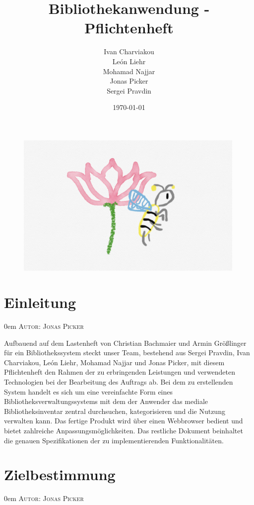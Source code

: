 \documentclass{article}
\title{Bibliothekanwendung - Pflichtenheft}
\date{\today}
\author{
	Ivan Charviakou\\
	León Liehr\\
	Mohamad Najjar\\
	Jonas Picker\\
	Sergei Pravdin
}
\makeatletter
\newcommand{\sectionauthor}[1]{
	{\parindent 0em \large \scshape Autor: #1 \par \nobreak \vspace*{2em}}
	\@afterheading
}
\makeatother
\begin{document}
\maketitle
\begin{figure}[h]
	\centering
	\includegraphics[width = 30em]{Logo}
\end{figure}
\newpage

\tableofcontents
\newpage

\section{Einleitung} %
\sectionauthor{Jonas Picker}
Aufbauend auf dem Lastenheft von Christian Bachmaier und Armin Größlinger für ein Bibliothekssystem steckt unser Team, bestehend aus Sergei Pravdin, Ivan Charviakou, León Liehr, Mohamad Najjar und Jonas Picker, mit diesem Pflichtenheft den Rahmen der zu erbringenden Leistungen und verwendeten Technologien bei der Bearbeitung des Auftrags ab. Bei dem zu erstellenden System handelt es sich um eine vereinfachte Form eines Bibliotheksverwaltungssystems mit dem der Anwender das mediale Bibliotheksinventar zentral durchsuchen, kategorisieren und die Nutzung verwalten kann. Das fertige Produkt wird über einen Webbrowser bedient und bietet zahlreiche Anpassungsmöglichkeiten. Das restliche Dokument beinhaltet die genauen Spezifikationen der zu implementierenden Funktionalitäten.

\section{Zielbestimmung} %
\sectionauthor{Jonas Picker}
\end{document}
